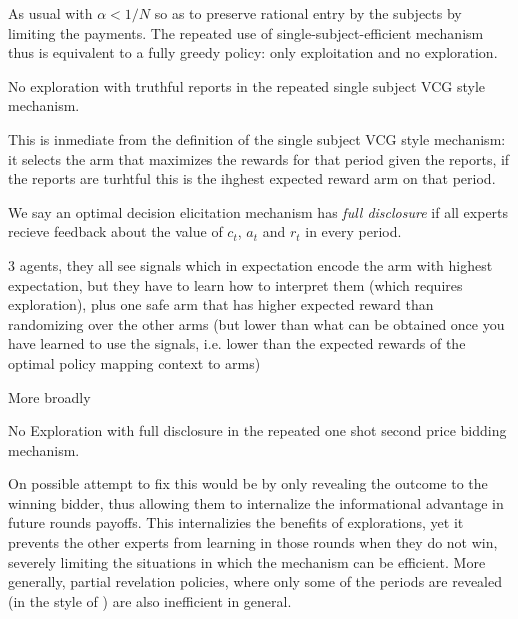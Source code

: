 As usual with $\alpha < 1/N$ so as to preserve rational entry by the subjects by limiting the payments.
The repeated use of single-subject-efficient mechanism thus is equivalent to a fully greedy policy: only exploitation and no exploration.

\begin{lem}
No exploration with truthful reports in the repeated single subject VCG style mechanism.
\end{lem}

This is inmediate from the definition of the single subject VCG style mechanism: it selects the arm that maximizes the rewards for that period given the reports, if the reports are turhtful this is the ihghest expected reward arm on that period. 

\begin{defn}
We say an optimal decision elicitation mechanism has \emph{full disclosure} if all experts recieve feedback about the value of $c_t$, $a_t$ and $r_t$ in every period.
\end{defn}


\begin{eg}
3 agents, they all see signals which in expectation encode the arm with highest expectation, but they have to learn how to interpret them (which requires exploration), plus one safe arm that has higher expected reward than randomizing over the other arms (but lower than what can be obtained once you have learned to use the signals, i.e. lower than the expected rewards of the optimal policy mapping context to arms)
\end{eg}

More broadly

\begin{lem}
No Exploration with full disclosure in the repeated one shot second price bidding mechanism.
\end{lem}



On possible attempt to fix this would be by only revealing the outcome to the winning bidder, thus allowing them to internalize the informational advantage in future rounds payoffs. 
This  internalizies the benefits of explorations, yet it prevents the other experts from learning in those rounds when they do not win, severely limiting the situations in which the mechanism can be efficient. 
More generally, partial revelation policies, where only some of the periods are revealed (in the style of  \cite{mansour2015bayesian} ) are also inefficient in general. 
 
